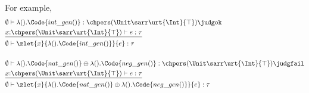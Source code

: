 For example,
\begin{align*}
  &\emptyset \vdash \lambda ().\Code{int\_gen()} : \chpers (\Unit\sarr\urt{\Int}{\top})  \judgok
  \\&\underline{x{:}\chpers (\Unit\sarr\urt{\Int}{\top}) \vdash e : \tau}
  \\&\emptyset \vdash \zlet{x}{\lambda ().\Code{int\_gen()}}{e} : \tau
  \\
  \\&\emptyset \vdash \lambda ().\Code{nat\_gen()} \oplus \lambda ().\Code{neg\_gen()} : \chpers (\Unit\sarr\urt{\Int}{\top}) \judgfail
  \\&\underline{x{:}\chpers (\Unit\sarr\urt{\Int}{\top}) \vdash e : \tau}
  \\  &\emptyset \vdash \zlet{x}{\lambda ().\Code{nat\_gen()} \oplus \lambda ().\Code{neg\_gen()}}{e} : \tau
\end{align*}\noindent

